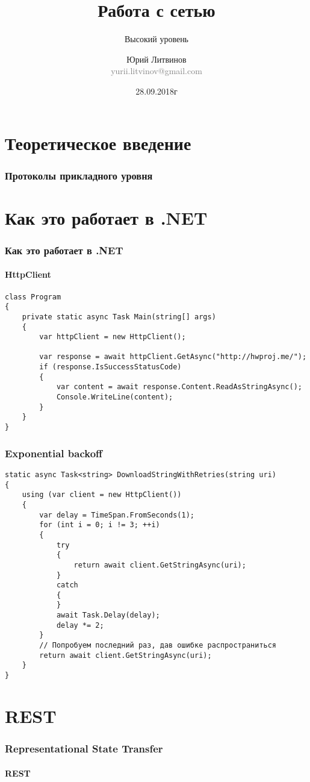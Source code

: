 \documentclass[xetex,mathserif,serif]{beamer}
\title{Работа с сетью}
\subtitle{Высокий уровень}
\author[Юрий Литвинов]{Юрий Литвинов\\\small{\textcolor{gray}{yurii.litvinov@gmail.com}}}
\date{28.09.2018г}
\begin{document}
	\frame{\titlepage}

	\section{Теоретическое введение}

	\begin{frame}
		\frametitle{Протоколы прикладного уровня}
	\end{frame}

	\section{Как это работает в .NET}

	\begin{frame}[fragile]
		\frametitle{Как это работает в .NET}
		\framesubtitle{HttpClient}
		\begin{verbatim}
class Program
{
    private static async Task Main(string[] args)
    {
        var httpClient = new HttpClient();

        var response = await httpClient.GetAsync("http://hwproj.me/");
        if (response.IsSuccessStatusCode)
        {
            var content = await response.Content.ReadAsStringAsync();
            Console.WriteLine(content);
        }
    }
}
		\end{verbatim}
	\end{frame}

	\begin{frame}[fragile]
		\frametitle{Exponential backoff}
		\begin{small}
			\begin{verbatim}
static async Task<string> DownloadStringWithRetries(string uri)
{
    using (var client = new HttpClient())
    {
        var delay = TimeSpan.FromSeconds(1);
        for (int i = 0; i != 3; ++i)
        {
            try
            {
                return await client.GetStringAsync(uri);
            }
            catch
            {
            }
            await Task.Delay(delay);
            delay *= 2;
        }
        // Попробуем последний раз, дав ошибке распространиться
        return await client.GetStringAsync(uri);
    }
}
			\end{verbatim}
		\end{small}
	\end{frame}

	\section{REST}

	\begin{frame}
		\frametitle{Representational State Transfer}
		\framesubtitle{REST}
	\end{frame}
\end{document}
